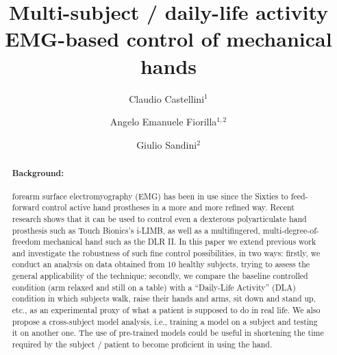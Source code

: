 \documentclass[10pt]{bmc_article}
\newenvironment{bmcformat}
  {\begin{raggedright}\baselineskip20pt\sloppy\setboolean{publ}{false}}
  {\end{raggedright}\baselineskip20pt\sloppy}
\begin{document}
\begin{bmcformat}

\title{Multi-subject / daily-life activity\\EMG-based control of mechanical hands}
 
\author{%
  Claudio Castellini\correspondingauthor$^1$%
\and
  Angelo Emanuele Fiorilla$^{1,2}$%
\and
  Giulio Sandini$^2$%
}%

\address{%
    \iid(1)DIST, University of Genova, viale F. Causa 13, 16145 Genova, Italy\\
    \iid(2)Italian Institute of Technology, via Morego 30, 16163 Genova, Italy
}%

\maketitle

\begin{abstract}

\paragraph*{Background:}

forearm surface electromyography (EMG) has been in use since the Sixties
to feed-forward control active hand prostheses in a more and more refined way.
Recent research shows that it can be used to control even a dexterous
polyarticulate hand prosthesis such as Touch Bionics's i-LIMB,
as well as a multifingered, multi-degree-of-freedom mechanical hand such
as the DLR II. In this paper we extend previous work and investigate
the robustness of such fine control possibilities, in two ways: firstly,
we conduct an analysis on data obtained from $10$ healthy subjects, trying
to assess the general applicability of the technique; secondly, we compare
the baseline controlled condition (arm relaxed and still on a table) with
a ``Daily-Life Activity'' (DLA) condition in which subjects walk, raise
their hands and arms, sit down and stand up, etc., as an experimental proxy
of what a patient is supposed to do in real life.
We also propose a cross-subject model analysis,
i.e., training a model on a subject and testing it on another one. The use
of pre-trained models could be useful in shortening the time required by
the subject / patient to become proficient in using the hand.


\end{abstract}
\end{bmcformat}
\end{document}
